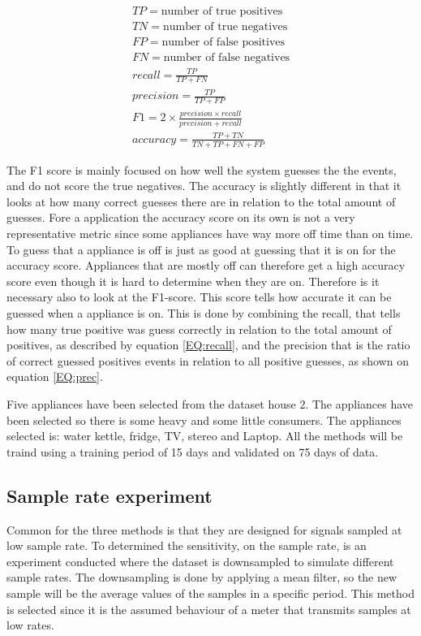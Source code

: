 \begin{gather}
		TP = \text{number of true positives} \\
		TN = \text{number of true negatives} \\
		FP = \text{number of false positives} \\
		FN = \text{number of false negatives} \\
		recall = \frac{TP}{TP+FN} \label{EQ:recall}\\
		precision = \frac{TP}{TP+FP} \label{EQ:prec} \\
		F1 = 2 \times \frac{precision \times recall}{precision + recall} \label{EQ:F1}\\
		accuracy = \frac{TP+TN}{TN+TP+FN+FP} \label{EQ:ACC}
\end{gather}

The F1 score is mainly focused on how well the system guesses the the events, and do not score the true negatives. The accuracy is slightly different in that it looks at how many correct guesses there are in relation to the total amount of guesses. Fore a  application the accuracy score on its own is not a very representative metric since some appliances have way more off time than on time. To guess that a appliance is off is just as good at guessing that it is on for the accuracy score. Appliances that are mostly off can therefore get a high accuracy score even though it is hard to determine when they are on. Therefore is it necessary also to look at the F1-score. This score tells how accurate it can be guessed when a appliance is on. This is done by combining the recall, that tells how many true positive was guess correctly in relation to the total amount of positives, as described by equation \ref{EQ:recall}, and the precision that is the ratio of correct guessed positives events in relation to all positive guesses, as shown on equation \ref{EQ:prec}. 

Five appliances have been selected from the  dataset house 2. The appliances have been selected so there is some heavy and some little consumers. The appliances selected is: water kettle, fridge, TV, stereo and Laptop. All the methods will be traind using a training period of 15 days and validated on 75 days of data. 

\subsection{Sample rate experiment}
Common for the three methods is that they are designed for signals sampled at low sample rate. To determined the sensitivity, on the sample rate, is an experiment conducted where the dataset is downsampled to simulate different sample rates. The downsampling is done by applying a mean filter, so the new sample will be the average values of the samples in a specific period. This method is selected since it is the assumed behaviour of a meter that transmits samples at low rates. 

